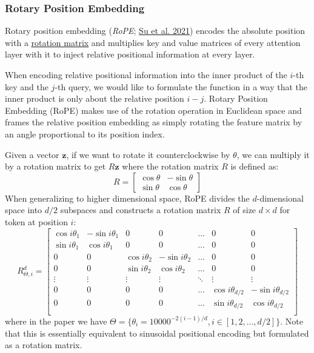\documentclass[12pt]{article}
\begin{document}
\subsubsection*{Rotary Position Embedding}
Rotary position embedding (\emph{RoPE}; \href{https://arxiv.org/abs/2104.09864}{Su et al. 2021}) encodes the absolute position with a \href{https://en.wikipedia.org/wiki/Rotation_matrix}{rotation matrix} and multiplies key and value matrices of every attention layer with it to inject relative positional information at every layer.

When encoding relative positional information into the inner product of the $i$-th key and the $j$-th query, we would like to formulate the function in a way that the inner product is only about the relative position $i-j$. Rotary Position Embedding (RoPE) makes use of the rotation operation in Euclidean space and frames the relative position embedding as simply rotating the feature matrix by an angle proportional to its position index.

Given a vector $\mathbf{z}$, if we want to rotate it counterclockwise by $\theta$, we can multiply it by a rotation matrix to get $R\mathbf{z}$ where the rotation matrix $R$ is defined as:
\[
R = \begin{bmatrix}
\cos\theta & -\sin\theta \\
\sin\theta & \cos\theta
\end{bmatrix}
\]
When generalizing to higher dimensional space, RoPE divides the $d$-dimensional space into $d/2$ subspaces and constructs a rotation matrix $R$ of size $d \times d$ for token at position $i$:
\[
R^d_{\Theta, i} = \begin{bmatrix}
\cos i\theta_1 & -\sin i\theta_1 & 0 & 0 & \dots & 0 & 0 \\
\sin i\theta_1 & \cos i\theta_1 & 0 & 0 & \dots & 0 & 0 \\
0 & 0 & \cos i\theta_2 & -\sin i\theta_2 & \dots & 0 & 0 \\
0 & 0 & \sin i\theta_2 & \cos i\theta_2 & \dots & 0 & 0 \\
\vdots & \vdots & \vdots & \vdots & \ddots & \vdots & \vdots \\
0 & 0 & 0 & 0 & \dots & \cos i\theta_{d/2} & -\sin i\theta_{d/2} \\
0 & 0 & 0 & 0 & \dots & \sin i\theta_{d/2} & \cos i\theta_{d/2} \\
\end{bmatrix}
\]
where in the paper we have $\Theta = \{\theta_i = 10000^{-2(i-1)/d}, i \in [1, 2, \ldots, d/2]\}$. Note that this is essentially equivalent to sinusoidal positional encoding but formulated as a rotation matrix.
\end{document}
